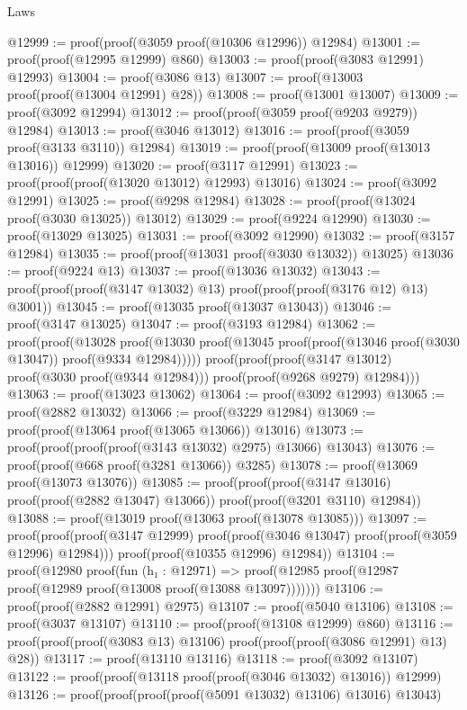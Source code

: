 \begin{lexlean}{Laws}
\begin{coremodule}
@12999 := proof(proof(@3059 proof(@10306 @12996)) @12984)
@13001 := proof(proof(@12995 @12999) @860)
@13003 := proof(proof(@3083 @12991) @12993)
@13004 := proof(@3086 @13)
@13007 := proof(@13003 proof(proof(@13004 @12991) @28))
@13008 := proof(@13001 @13007)
@13009 := proof(@3092 @12994)
@13012 := proof(proof(@3059 proof(@9203 @9279)) @12984)
@13013 := proof(@3046 @13012)
@13016 := proof(proof(@3059 proof(@3133 @3110)) @12984)
@13019 := proof(proof(@13009 proof(@13013 @13016)) @12999)
@13020 := proof(@3117 @12991)
@13023 := proof(proof(proof(@13020 @13012) @12993) @13016)
@13024 := proof(@3092 @12991)
@13025 := proof(@9298 @12984)
@13028 := proof(proof(@13024 proof(@3030 @13025)) @13012)
@13029 := proof(@9224 @12990)
@13030 := proof(@13029 @13025)
@13031 := proof(@3092 @12990)
@13032 := proof(@3157 @12984)
@13035 := proof(proof(@13031 proof(@3030 @13032)) @13025)
@13036 := proof(@9224 @13)
@13037 := proof(@13036 @13032)
@13043 := proof(proof(proof(@3147 @13032) @13) proof(proof(proof(@3176 @12) @13) @3001))
@13045 := proof(@13035 proof(@13037 @13043))
@13046 := proof(@3147 @13025)
@13047 := proof(@3193 @12984)
@13062 := proof(proof(@13028
        proof(@13030 proof(@13045 proof(proof(@13046 proof(@3030 @13047)) proof(@9334 @12984)))))
      proof(proof(proof(@3147 @13012) proof(@3030 proof(@9344 @12984)))
          proof(proof(@9268 @9279) @12984)))
@13063 := proof(@13023 @13062)
@13064 := proof(@3092 @12993)
@13065 := proof(@2882 @13032)
@13066 := proof(@3229 @12984)
@13069 := proof(proof(@13064 proof(@13065 @13066)) @13016)
@13073 := proof(proof(proof(proof(@3143 @13032) @2975) @13066) @13043)
@13076 := proof(proof(@668 proof(@3281 @13066)) @3285)
@13078 := proof(@13069 proof(@13073 @13076))
@13085 := proof(proof(proof(@3147 @13016) proof(proof(@2882 @13047) @13066))
      proof(proof(@3201 @3110) @12984))
@13088 := proof(@13019 proof(@13063 proof(@13078 @13085)))
@13097 := proof(proof(proof(@3147 @12999)
        proof(proof(@3046 @13047) proof(proof(@3059 @12996) @12984)))
      proof(proof(@10355 @12996) @12984))
@13104 := proof(@12980
      proof(fun (h₁ : @12971) =>
        proof(@12985 proof(@12987 proof(@12989 proof(@13008 proof(@13088 @13097)))))))
@13106 := proof(proof(@2882 @12991) @2975)
@13107 := proof(@5040 @13106)
@13108 := proof(@3037 @13107)
@13110 := proof(proof(@13108 @12999) @860)
@13116 := proof(proof(proof(@3083 @13) @13106) proof(proof(proof(@3086 @12991) @13) @28))
@13117 := proof(@13110 @13116)
@13118 := proof(@3092 @13107)
@13122 := proof(proof(@13118 proof(proof(@3046 @13032) @13016)) @12999)
@13126 := proof(proof(proof(proof(@5091 @13032) @13106) @13016) @13043)

\end{coremodule}
\end{lexlean}
